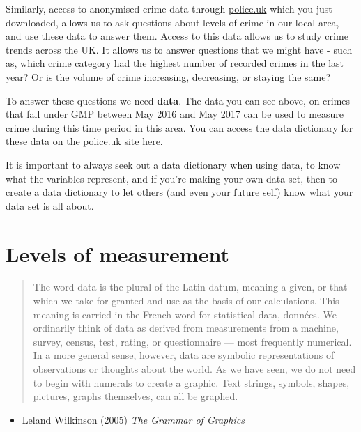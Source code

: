 \documentclass[]{book}
\providecommand{\tightlist}{%
  \setlength{\itemsep}{0pt}\setlength{\parskip}{0pt}}
\theoremstyle{definition}
\theoremstyle{definition}
\theoremstyle{definition}
\theoremstyle{remark}
\begin{document}
Similarly, access to anonymised crime data through
\href{www.police.uk}{police.uk} which you just downloaded, allows us to
ask questions about levels of crime in our local area, and use these
data to answer them. Access to this data allows us to study crime trends
across the UK. It allows us to answer questions that we might have -
such as, which crime category had the highest number of recorded crimes
in the last year? Or is the volume of crime increasing, decreasing, or
staying the same?

To answer these questions we need \textbf{data}. The data you can see
above, on crimes that fall under GMP between May 2016 and May 2017 can
be used to measure crime during this time period in this area. You can
access the data dictionary for these data
\href{https://data.police.uk/about/\#columns}{on the police.uk site
here}.

It is important to always seek out a data dictionary when using data, to
know what the variables represent, and if you're making your own data
set, then to create a data dictionary to let others (and even your
future self) know what your data set is all about.

\hypertarget{levels-of-measurement}{%
\section{Levels of measurement}\label{levels-of-measurement}}

\begin{quote}
The word data is the plural of the Latin datum, meaning a given, or that
which we take for granted and use as the basis of our calculations. This
meaning is carried in the French word for statistical data, données. We
ordinarily think of data as derived from measurements from a machine,
survey, census, test, rating, or questionnaire --- most frequently
numerical. In a more general sense, however, data are symbolic
representations of observations or thoughts about the world. As we have
seen, we do not need to begin with numerals to create a graphic. Text
strings, symbols, shapes, pictures, graphs themselves, can all be
graphed.
\end{quote}

\begin{itemize}
\tightlist
\item
  Leland Wilkinson (2005) \emph{The Grammar of Graphics}
\end{itemize}
\end{document}
